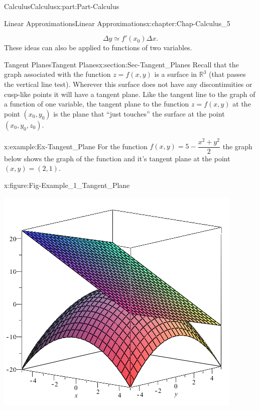 \documentclass[oneside,10pt,]{book}
\numberwithin{equation}{section}
\begin{document}
\begin{partptx}{Calculus}{}{Calculus}{}{}{x:part:Part-Calculus}
\begin{chapterptx}{Linear Approximations}{}{Linear Approximations}{}{}{x:chapter:Chap-Calculus_5}
\begin{introduction}{}
\begin{equation*}
\Delta y \simeq f'(x_0) \Delta x\text{.}
\end{equation*}
These ideas can also be applied to functions of two variables.%
\end{introduction}%
%
%
\typeout{************************************************}
\typeout{************************************************}
%
\begin{sectionptx}{Tangent Planes}{}{Tangent Planes}{}{}{x:section:Sec-Tangent_Planes}
Recall  that  the  graph  associated  with  the  function \(z=f(x,y)\) is  a  surface  in \(\mathbb{R}^3\) (that passes the vertical line test). Wherever this surface does not have any discontinuities or cusp-like points it will have a tangent plane. Like the tangent line to the graph of a function of one variable,  the  tangent  plane  to  the  function \(z=f(x,y)\) at  the  point \((x_0,y_0)\) is  the  plane  that ``just touches'' the surface at the point \((x_0,y_0,z_0)\).%
\begin{example}{}{x:example:Ex-Tangent_Plane}%
For  the  function \(f(x,y) = 5-\dfrac{x^2+y^2}{2}\) the  graph  below  shows  the  graph of the function and it’s tangent plane at the point \((x,y) = (2,1)\).%
\begin{figureptx}{}{x:figure:Fig-Example_1_Tangent_Plane}{}%
\begin{image}{0.15}{0.7}{0.15}%
\includegraphics[width=\linewidth]{./Calculus/Images/5/Ex1_Tangent_Plane.png}

\end{image}
\end{figureptx}
\end{example}
\end{sectionptx}
\end{chapterptx}
\end{partptx}
\end{document}
